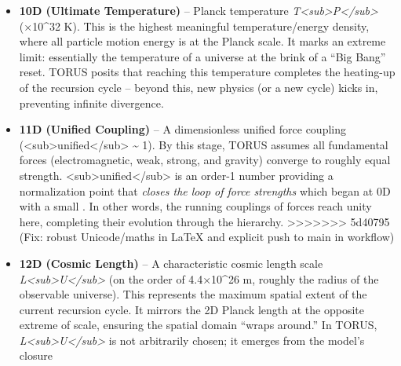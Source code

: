 \documentclass[]{article}
\begin{document}
{\begin{itemize}
  their evolution through the hierarchy\hspace{0pt}.
=======
  \emph{G} (×10\^{}-11 m³/kg·s²)​. This introduces gravity's
  strength at large scales. \emph{G} ties into the lower-dimensional
  constants via Planck units, ensuring that gravity consistently
  interlocks with quantum scales​. In TORUS, \emph{G} is not a free
  parameter but is fixed by the requirement that the recursion from
  quantum to macro scales be smooth (indeed, the observed value of
  \emph{G} turns out to be exactly what's needed for consistency with
  the lower layers)​.
\item
  \textbf{10D (Ultimate Temperature)} -- Planck temperature
  \emph{T\textless{}sub\textgreater{}P\textless{}/sub\textgreater{}} (×10\^{}32 K)​. This is the highest meaningful temperature/energy
  density, where all particle motion energy is at the Planck scale. It
  marks an extreme limit: essentially the temperature of a universe at
  the brink of a ``Big Bang'' reset. TORUS posits that reaching this
  temperature completes the heating-up of the recursion cycle​ -- beyond
  this, new physics (or a new cycle) kicks in, preventing infinite
  divergence.
\item
  \textbf{11D (Unified Coupling)} -- A dimensionless unified force
  coupling
  (\alpha\textless{}sub\textgreater{}unified\textless{}/sub\textgreater{}
  \textasciitilde{} 1)​. By this stage, TORUS assumes all fundamental
  forces (electromagnetic, weak, strong, and gravity) converge to
  roughly equal strength.
  \alpha\textless{}sub\textgreater{}unified\textless{}/sub\textgreater{} is
  an order-1 number providing a normalization point that \emph{closes
  the loop of force strengths} which began at 0D with a small \alpha. In
  other words, the running couplings of forces reach unity here,
  completing their evolution through the hierarchy​.
>>>>>>> 5d40795 (Fix: robust Unicode/maths in LaTeX and explicit push to main in workflow)
\item
  \textbf{12D (Cosmic Length)} -- A characteristic cosmic length scale
  \emph{L\textless{}sub\textgreater{}U\textless{}/sub\textgreater{}} (on
  the order of 4.4×10\^{}26 m, roughly the radius of the observable
  universe)​. This represents the maximum spatial extent of the current
  recursion cycle. It mirrors the 2D Planck length at the opposite
  extreme of scale, ensuring the spatial domain ``wraps around.'' In
  TORUS,
  \emph{L\textless{}sub\textgreater{}U\textless{}/sub\textgreater{}} is
  not arbitrarily chosen; it emerges from the model's closure

\end{itemize}}
\end{document}
